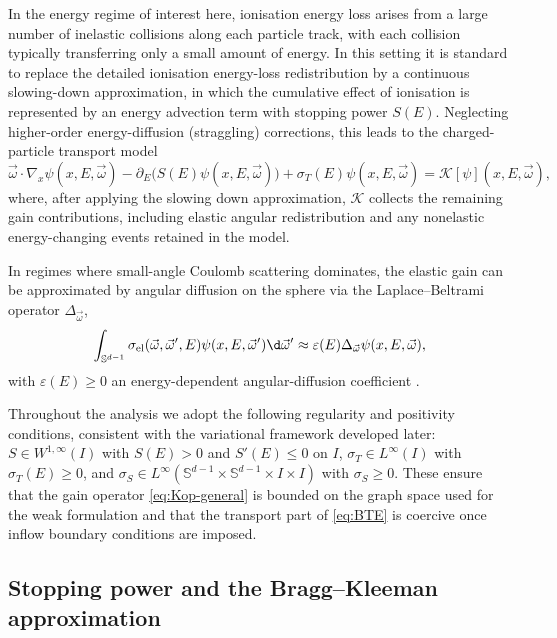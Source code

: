 \documentclass[final]{amsart}
\begin{document}
In the energy regime of interest here, ionisation energy loss arises
from a large number of inelastic collisions along each particle track,
with each collision typically transferring only a small amount of
energy. In this setting it is standard to replace the detailed
ionisation energy-loss redistribution by a continuous slowing-down
approximation, in which the cumulative effect of ionisation is
represented by an energy advection term with stopping power $S(E)$.
Neglecting higher-order energy-diffusion (straggling) corrections, this
leads to the charged-particle transport model
\begin{equation}
  \label{eq:BTE}
  \vec{\omega}\cdot\nabla_x \psi(x,E,\vec{\omega})
  - \partial_E\big(S(E)\psi(x,E,\vec{\omega})\big)
  + \sigma_T(E)\psi(x,E,\vec{\omega})
  =
  \mathcal{K}[\psi](x,E,\vec{\omega}),
\end{equation}
where, after applying the slowing down approximation, $\mathcal{K}$
collects the remaining gain contributions, including elastic angular
redistribution and any nonelastic energy-changing events retained in
the model.

In regimes where small-angle Coulomb scattering dominates, the elastic
gain can be approximated by angular diffusion on the sphere via the
Laplace--Beltrami operator $\Delta_{\vec{\omega}}$,
\begin{equation}
  \label{eq:FP-approx}
  \int_{\mathbb{S}^{d-1}}
  \sigma_{\text{el}}(\vec{\omega},\vec{\omega}',E)
  \psi(x,E,\vec{\omega}')  \d\vec{\omega}'
  \approx
  \varepsilon(E)\Delta_{\vec{\omega}}\psi(x,E,\vec{\omega}),
\end{equation}
with $\varepsilon(E)\ge 0$ an energy-dependent angular-diffusion
coefficient \cite{ashby2025positivity}.

Throughout the analysis we adopt the following regularity and
positivity conditions, consistent with the variational framework
developed later: $S \in W^{1,\infty}(I)$ with $S(E)>0$ and $S'(E)\le 0$
on $I$, $\sigma_T \in L^{\infty}(I)$ with $\sigma_T(E)\ge 0$, and
$\sigma_S \in L^{\infty}(\mathbb{S}^{d-1} \times \mathbb{S}^{d-1}
\times I \times I)$ with $\sigma_S\ge 0$. These ensure that the gain
operator \eqref{eq:Kop-general} is bounded on the graph space used for
the weak formulation and that the transport part of \eqref{eq:BTE} is
coercive once inflow boundary conditions are imposed.

\subsection{Stopping power and the Bragg--Kleeman approximation}
\end{document}
